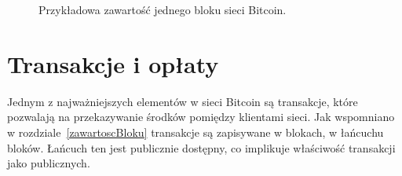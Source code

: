 \documentclass[12pt, oneside, final, openany]{mgr}
\begin{document}
\begin{figure}[H]
	\begin{center}	
	\end{center}
	\caption{Przykładowa zawartość jednego bloku sieci Bitcoin.}
	\label{fig:przykladowyBlok}
\end{figure}
\section{Transakcje i opłaty}
\label{transakcje}

\indent Jednym z najważniejszych elementów w sieci Bitcoin są transakcje, które pozwalają na przekazywanie środków pomiędzy klientami sieci. Jak wspomniano w rozdziale~\ref{zawartoscBloku} transakcje są zapisywane w blokach, w łańcuchu bloków. Łańcuch ten jest publicznie dostępny, co implikuje właściwość transakcji jako publicznych. 
\end{document}
